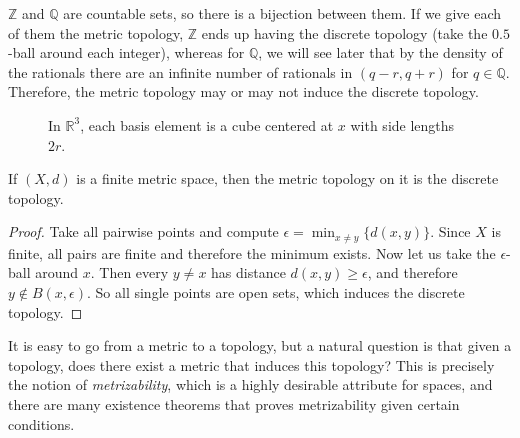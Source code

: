   \begin{example}
    $\mathbb{Z}$ and $\mathbb{Q}$ are countable sets, so there is a bijection between them. If we give each of them the metric topology, $\mathbb{Z}$ ends up having the discrete topology (take the $0.5$-ball around each integer), whereas for $\mathbb{Q}$, we will see later that by the density of the rationals there are an infinite number of rationals in $(q - r, q + r)$ for $q \in \mathbb{Q}$. Therefore, the metric topology may or may not induce the discrete topology. 
  \end{example}

  \begin{example}
    \begin{figure}[H]
      \centering 
      \caption{In $\mathbb{R}^3$, each basis element is a cube centered at $x$ with side lengths $2r$.} 
      \label{fig:}
    \end{figure}
  \end{example}

  \begin{theorem}
    If $(X, d)$ is a finite metric space, then the metric topology on it is the discrete topology. 
  \end{theorem}
  \begin{proof}
    Take all pairwise points and compute $\epsilon = \min_{x \neq y} \{d(x, y)\}$. Since $X$ is finite, all pairs are finite and therefore the minimum exists. Now let us take the $\epsilon$-ball around $x$. Then every $y \neq x$ has distance $d(x, y) \geq \epsilon$, and therefore $y \not\in B(x, \epsilon)$. So all single points are open sets, which induces the discrete topology. 
  \end{proof}

  It is easy to go from a metric to a topology, but a natural question is that given a topology, does there exist a metric that induces this topology? This is precisely the notion of \textit{metrizability}, which is a highly desirable attribute for spaces, and there are many existence theorems that proves metrizability given certain conditions.


